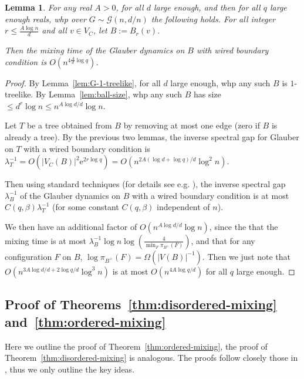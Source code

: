 \documentclass[11pt]{article}
\theoremstyle{plain}
\newtheorem{lemma}[theorem]{Lemma}
\newcommand{\G}{\mathcal{G}}
\newcommand{\emm}{\mathrm{e}}
\newcommand{\1}{\mathbb{1}}
\begin{document}
\begin{lemma}\label{lem:wired-mixing}
    For any real \(A>0\), for all \(d\) large enough, and then for all \(q\) large enough reals, whp over \(G\sim\G(n,d/n)\) the following holds. For all integer \(r\leq \frac{A\log n}{d}\) and all \(v\in V_C\), let \(B := B_r(v)\).
    
    Then the mixing time of the Glauber dynamics on \(B\) with wired boundary condition is $O(n^{4\frac{A}{d} \log q})$.
\end{lemma}
\begin{proof}
    By Lemma~\ref{lem:G-1-treelike}, for all \(d\) large enough, whp any such \(B\) is \(1\)-treelike. By Lemma~\ref{lem:ball-size}, whp any such \(B\) has size \(\leq d^{r}\log n \leq n^{A\log d / d}\log n\).
    
    Let \(T\) be a tree obtained from \(B\) by removing at most one edge (zero if \(B\) is already a tree). By the previous two lemmas, the inverse spectral gap for Glauber on \(T\) with a wired boundary condition is \(\lambda_T^{-1} =O(|V_C(B)|^2 \emm^{2r\log q}) = O(n^{2A(\log d + \log q)/d} \log^2 n)\).

    Then using standard techniques (for details see e.g.  \cite[Lemma~6.10]{BlaGhe}), the inverse spectral gap \(\lambda^{-1}_B\) of the Glauber dynamics on \(B\) with a wired boundary condition is at most \(C(q,\beta) \lambda^{-1}_T\) (for some constant \(C(q,\beta)\) independent of \(n\)).

    We then have an additional factor of \(O(n^{A\log d/d}\log n)\), since the  that the mixing time is at most \(\lambda_B^{-1}\log n\log({\frac{4}{\min_F \pi_{B^+}(F)}})\), and that for any configuration \(F\) on \(B\), \(\log \pi_{B^+}(F) = \Omega(|V(B)|^{-1})\). Then we just note that \(O(n^{3A\log d/d + 2\log q/d}\log^3 n)\) is at most \(O(n^{4A\log q/d})\) for all \(q\) large enough.
\end{proof}

\subsection{Proof of Theorems~\ref{thm:disordered-mixing} and~\ref{thm:ordered-mixing}}\label{sec:proof-sketch}

Here we outline the proof of Theorem~\ref{thm:ordered-mixing}, the proof of Theorem~\ref{thm:disordered-mixing} is analogous. The proofs follow closely those in \cite{galanis2024plantingmcmcsamplingpottsarxiv,SinclairsGheissari2022,Galanis_Goldberg_Smolarova_2024}, thus we only outline the key ideas.
\end{document}
